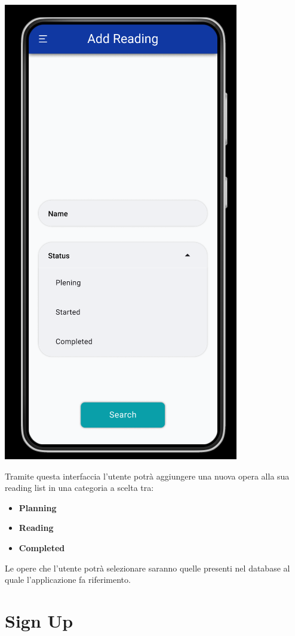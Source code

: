 \documentclass{report}
\begin{document}
\begin{center}
   \includegraphics[scale=0.4]{add_reading.png}
\end{center}

Tramite questa interfaccia l'utente potrà aggiungere una nuova opera alla sua reading list in una categoria a scelta tra:
\begin{itemize}
   \item \textbf{Planning}
   \item \textbf{Reading}
   \item \textbf{Completed}
\end{itemize}
Le opere che l'utente potrà selezionare saranno quelle presenti nel database al quale l'applicazione fa riferimento.

\section{Sign Up}
\end{document}
